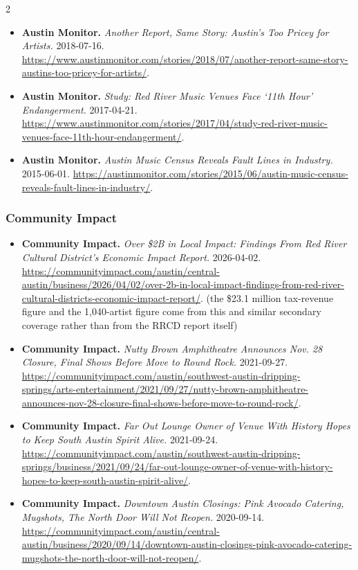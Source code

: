 {\begin{multicols}{2}
\begin{itemize}[itemsep=0pt,topsep=1pt,parsep=0pt,partopsep=0pt,leftmargin=1em]
\item \textbf{Austin Monitor.} \textit{Another Report, Same Story: Austin’s Too Pricey for Artists.} 2018-07-16. \url{https://www.austinmonitor.com/stories/2018/07/another-report-same-story-austins-too-pricey-for-artists/}.
\item \textbf{Austin Monitor.} \textit{Study: Red River Music Venues Face ‘11th Hour’ Endangerment.} 2017-04-21. \url{https://www.austinmonitor.com/stories/2017/04/study-red-river-music-venues-face-11th-hour-endangerment/}.
\item \textbf{Austin Monitor.} \textit{Austin Music Census Reveals Fault Lines in Industry.} 2015-06-01. \url{https://austinmonitor.com/stories/2015/06/austin-music-census-reveals-fault-lines-in-industry/}.
\end{itemize}
\subsubsection*{Community Impact}
\begin{itemize}[itemsep=0pt,topsep=1pt,parsep=0pt,partopsep=0pt,leftmargin=1em]
\item \textbf{Community Impact.} \textit{Over \$2B in Local Impact: Findings From Red River Cultural District’s Economic Impact Report.} 2026-04-02. \url{https://communityimpact.com/austin/central-austin/business/2026/04/02/over-2b-in-local-impact-findings-from-red-river-cultural-districts-economic-impact-report/}. {\color{ammuted}(the \$23.1 million tax-revenue figure and the 1,040-artist figure come from this and similar secondary coverage rather than from the RRCD report itself)}
\item \textbf{Community Impact.} \textit{Nutty Brown Amphitheatre Announces Nov. 28 Closure, Final Shows Before Move to Round Rock.} 2021-09-27. \url{https://communityimpact.com/austin/southwest-austin-dripping-springs/arts-entertainment/2021/09/27/nutty-brown-amphitheatre-announces-nov-28-closure-final-shows-before-move-to-round-rock/}.
\item \textbf{Community Impact.} \textit{Far Out Lounge Owner of Venue With History Hopes to Keep South Austin Spirit Alive.} 2021-09-24. \url{https://communityimpact.com/austin/southwest-austin-dripping-springs/business/2021/09/24/far-out-lounge-owner-of-venue-with-history-hopes-to-keep-south-austin-spirit-alive/}.
\item \textbf{Community Impact.} \textit{Downtown Austin Closings: Pink Avocado Catering, Mugshots, The North Door Will Not Reopen.} 2020-09-14. \url{https://communityimpact.com/austin/central-austin/business/2020/09/14/downtown-austin-closings-pink-avocado-catering-mugshots-the-north-door-will-not-reopen/}.

\end{itemize}
\end{multicols}}
